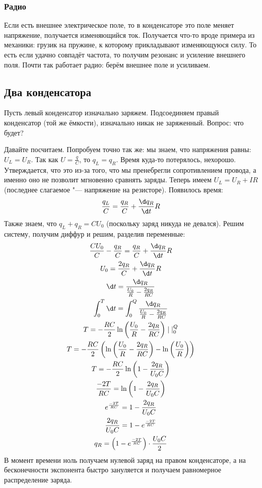	\subsubsection{Радио}
		Если есть внешнее электрическое поле, то в конденсаторе это поле меняет напряжение,
		получается изменяющийся ток.
		Получается что-то вроде примера из механики: грузик на пружине, к которому прикладывают изменяющуюся силу.
		То есть если удачно совпадёт частота, то получим резонанс и усиление внешнего поля.
		Почти так работает радио: берём внешнее поле и усиливаем.

\subsection{Два конденсатора}
	Пусть левый конденсатор изначально заряжем.
	Подсоединяем правый конденсатор (той же ёмкости), изначально никак не заряженный.
	Вопрос: что будет?

	Давайте посчитаем.
	Попробуем точно так же: мы знаем, что напряжения равны: $U_L=U_R$.
	Так как $U=\frac q C$, то $q_L=q_R$.
	Время куда-то потерялось, нехорошо.
	Утверждается, что это из-за того, что мы пренебрегли сопротивлением провода,
	а именно оно не позволит мгновенно сравнять заряды.
	Теперь имеем $U_L=U_R + IR$ (последнее слагаемое "--- напряжение на резисторе).
	Появилось время:
	\[
		\frac{q_L}{C} = \frac{q_R}{C} + \frac{\d q_R}{\d t}R
	\]
	Также знаем, что $q_L + q_R = CU_0$ (поскольку заряд никуда не девался).
	Решим систему, получим диффур и решим, разделив переменные:
	\begin{gather*}
		\frac{CU_0}{C} - \frac{q_R}{C} = \frac{q_R}{C} + \frac{\d q_R}{\d t} R \\
		U_0 = \frac{2q_R}{C} + \frac{\d q_R}{\d t} R \\
		\d t = \frac{\d q_R}{\frac{U_0}{R} - \frac{2q_R}{RC}} \\
		\int_0^T \d t = \int_0^Q \frac{\d q_R}{\frac{U_0}{R} - \frac{2q_R}{RC}} \\
		T = -\frac {RC} 2 \ln \left(\frac{U_0}{R} - \frac{2q_R}{RC}\right) \mid|_0^Q \\
		T = -\frac {RC} 2 \left( \ln \left(\frac{U_0}{R} - \frac{2q_R}{RC}\right) - \ln \left(\frac{U_0}{R}\right) \right) \\
		T = -\frac {RC} 2 \ln \left(1 - \frac{2q_R}{U_0C}\right) \\
		\frac{-2T}{RC} = \ln \left(1 - \frac{2q_R}{U_0C}\right) \\
		e^{\frac{-2T}{RC}} = 1 - \frac{2q_R}{U_0C} \\
		\frac{2q_R}{U_0C} = 1 - e^{\frac{-2T}{RC}} \\
		q_R = \left(1 - e^{\frac{-2T}{RC}}\right) \cdot \frac{U_0C}{2} \\
	\end{gather*}
	В момент времени ноль получаем нулевой заряд на правом конденсаторе, а на бесконечности экспонента быстро зануляется и получаем равномерное распределение заряда.

